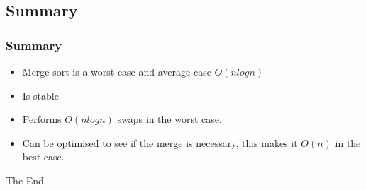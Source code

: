\documentclass{beamer}
\begin{document}
\subsection{Summary}
\begin{frame}
\frametitle{Summary}
\begin{itemize}
\item Merge sort is a worst case and average case $O(nlogn)$ 
\item Is stable
\item Performs $O(nlogn)$ swaps in the worst case.
\item Can be optimised to see if the merge is necessary, this makes it $O(n)$ in the best case.
\end{itemize}
\end{frame}
\begin{frame} 
\Huge{\centerline{The End}}
\end{frame}
\end{document}
